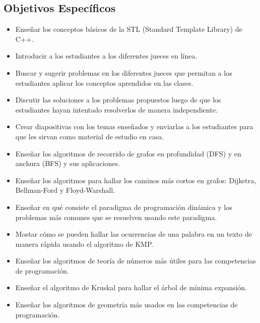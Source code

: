 \documentclass[11pt, oneside]{article}
\theoremstyle{definition}
\theoremstyle{remark}
\begin{document}
\subsection{Objetivos Específicos}
\begin{itemize}
	\item{Enseñar los conceptos básicos de la STL (Standard Template Library) de C++.}
	\item{Introducir a los estudiantes a los diferentes jueces en línea.}
	\item{Buscar y sugerir problemas en los diferentes jueces que permitan a los estudiantes aplicar los conceptos aprendidos en las clases.}
	\item{Discutir las soluciones a los problemas propuestos luego de que los estudiantes hayan intentado resolverlos de manera independiente.}
	\item{Crear diapositivas con los temas enseñados y enviarlas a los estudiantes para que les sirvan como material de estudio en casa.}
	\item{Enseñar los algoritmos de recorrido de grafos en profundidad (DFS) y en anchura (BFS) y sus aplicaciones.}
	\item{Enseñar los algoritmos para hallar los caminos más cortos en grafos: Dijkstra, Bellman-Ford y Floyd-Warshall.}
	\item{Enseñar en qué consiste el paradigma de programación dinámica y los problemas más comunes que se resuelven usando este paradigma.}
	\item{Mostar cómo se pueden hallar las ocurrencias de una palabra en un texto de manera rápida usando el algoritmo de KMP.}
	\item{Enseñar los algoritmos de teoría de números más útiles para las competencias de programación.}
	\item{Enseñar el algoritmo de Kruskal para hallar el árbol de mínima expansión.}
	\item{Enseñar los algoritmos de geometría más usados en las competencias de programación.}
\end{itemize}
\end{document}
